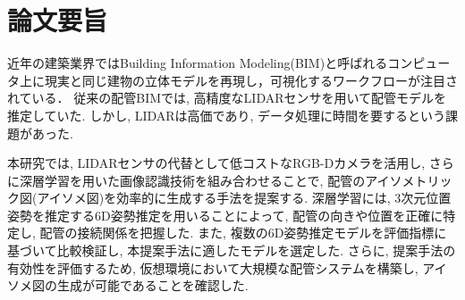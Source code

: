 \section*{論文要旨}

近年の建築業界ではBuilding Information Modeling(BIM)と呼ばれるコンピュータ上に現実と同じ建物の立体モデルを再現し，可視化するワークフローが注目されている．
従来の配管BIMでは, 高精度なLIDARセンサを用いて配管モデルを推定していた. 
しかし, LIDARは高価であり, データ処理に時間を要するという課題があった. 

本研究では, LIDARセンサの代替として低コストなRGB-Dカメラを活用し, さらに深層学習を用いた画像認識技術を組み合わせることで, 配管のアイソメトリック図(アイソメ図)を効率的に生成する手法を提案する. 
深層学習には, 3次元位置姿勢を推定する6D姿勢推定を用いることによって, 配管の向きや位置を正確に特定し, 配管の接続関係を把握した. 
また, 複数の6D姿勢推定モデルを評価指標に基づいて比較検証し, 本提案手法に適したモデルを選定した. 
さらに, 提案手法の有効性を評価するため, 仮想環境において大規模な配管システムを構築し, アイソメ図の生成が可能であることを確認した. 

